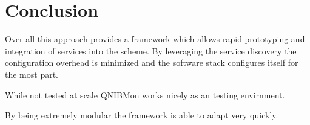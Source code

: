 \section{Conclusion}
Over all this approach provides a framework which allows rapid prototyping and integration of services into the scheme. By leveraging the service discovery the configuration
overhead is minimized and the software stack configures itself for the most part.

While not tested at scale QNIBMon works nicely as an testing envirnment.

By being extremely modular the framework is able to adapt very quickly.
